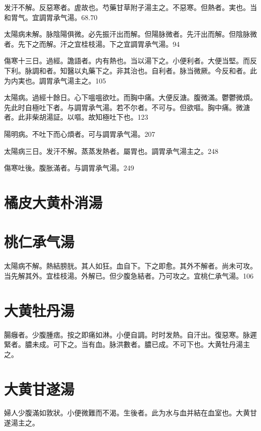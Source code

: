 \documentclass[b5paper,twoside,zihao=-4,UTF8]{ctexbook}
\begin{document}
发汗不解。反惡寒者。虗故也。芍藥甘草附子湯主之。不惡寒。但熱者。実也。当和胃气。宜調胃承气湯。68.70

太陽病未解。脉陰陽俱微。必先振汗出而解。但陽{脉}微者。先汗出而解。但陰{脉}微者。先下之而解。汗之宜桂枝湯。下之宜{調胃}承气湯。94

傷寒十三日。過經。譫語者。内有熱也。当以湯下之。小便利者。大便当堅。而反{下}利。脉調和者。知醫以丸藥下之。非其治也。自利者。脉当微厥。今反和者。此为内実也。{調胃}承气湯主之。105

太陽病。過經十餘日。心下嗢嗢欲吐。而胸中痛。大便反溏。腹微滿。鬱鬱微煩。先{此}时自極吐下者。与{調胃}承气湯。若不尔者。不可与。但欲嘔。胸中痛。微溏者。此非柴胡湯証。以嘔。故知極吐下也。123

陽明病。不吐下而{心}煩者。可与{調胃}承气湯。207

太陽病三日。发汗不解。蒸蒸发熱者。屬胃也。{調胃}承气湯主之。248

傷寒吐後。腹胀滿者。与{調胃}承气湯。249

\section{橘皮大黄朴消湯}

\section{桃仁承气湯}

太陽病不解。熱結膀胱。其人如狂。血自下。下之即愈。其外不解者。尚未可攻。当先解其外。{宜桂枝湯。}外解已。{但}少腹急結者。乃可攻之。宜桃仁承气湯。106

\section{大黄牡丹湯}

腸癰者。少腹腫痞。按之即痛如淋。小便自調。时时发熱。自汗出。復惡寒。脉遲緊者。膿未成。可下之。当有血。脉洪數者。膿已成。不可下也。大黄牡丹湯主之。

\section{大黄甘遂湯}

婦人少腹滿如敦狀。小便微難而不渴。生後者。此为水与血并結在血室也。大黄甘遂湯主之。
\end{document}
